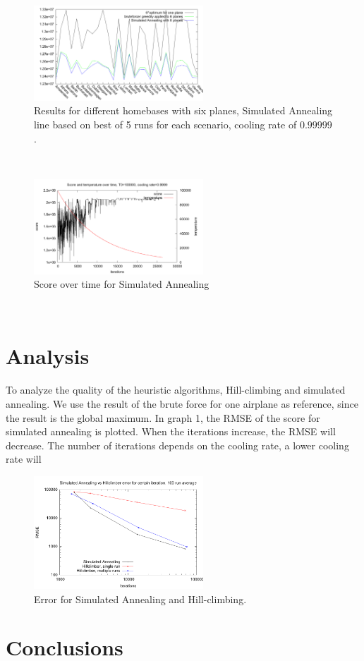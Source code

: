 \documentclass[journal]{IEEEtran}
\begin{document}
\begin{figure}[!h]
\centering
\includegraphics[width=2.5in]{different_homebases}
\caption{Results for different homebases with six planes, Simulated Annealing line based on best of 5 runs for each scenario, cooling rate of $0.99999$.}
\label{fig:different_homebase_six_planes}
\end{figure}
\\
\begin{figure}[!h]
\centering
\includegraphics[width=2.5in]{score_over_time}
\caption{Score over time for Simulated Annealing}
\label{fig:simulated_annealing_score}
\end{figure}
\\
\section{Analysis}
To analyze the quality of the heuristic algorithms, Hill-climbing and simulated annealing. We use the result of the brute force for one airplane as reference, since the result is the global maximum. In graph 1, the RMSE of the score for simulated annealing is plotted. When the iterations increase, the RMSE will decrease. The number of iterations depends on the cooling rate, a lower cooling rate will 
\begin{figure}[!h]
\centering
\includegraphics[width=2.5in]{iterations_vs_error_sa_hc}
\caption{Error for Simulated Annealing and Hill-climbing.}
\label{fig:error_sa_hc}
\end{figure}
\section{Conclusions}


\end{document}
